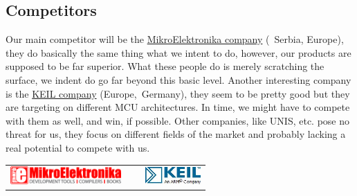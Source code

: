\documentclass[a4paper,twoside,15pt]{book}
\begin{document}
        \subsection{Competitors}
            Our main competitor will be the \href{http://www.mikroe.com/}{MikroElektronika company} (~Serbia, Europe), they do basically the same thing what we intent to do, however, our products are supposed to be far superior. What these people do is merely scratching the surface, we indent do go far beyond this basic level. Another interesting company is the \href{http://www.keil.com/}{KEIL company} (Europe,~Germany), they seem to be pretty good but they are targeting on different MCU architectures. In time, we might have to compete with them as well, and win, if possible. Other companies, like UNIS, etc. pose no threat for us, they focus on different fields of the market and probably lacking a real potential to compete with us.
            \begin{table}[h!]
                \centering{}
                \begin{tabular}{cp{40pt}c}
                    \includegraphics[width=120pt]{images/MikroElektronika_logo.png}
                        & ~ &
                    \includegraphics[width=60pt]{images/KeilARM.jpg} \\
                \end{tabular}
            \end{table}
\end{document}
